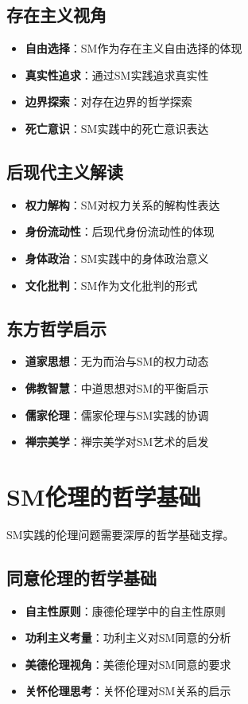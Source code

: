 \documentclass[12pt,UTF8]{ctexbook}
\begin{document}
\subsection{存在主义视角}
\begin{itemize}[leftmargin=2cm]
	\item \textbf{自由选择}：SM作为存在主义自由选择的体现
	\item \textbf{真实性追求}：通过SM实践追求真实性
	\item \textbf{边界探索}：对存在边界的哲学探索
	\item \textbf{死亡意识}：SM实践中的死亡意识表达
\end{itemize}

\subsection{后现代主义解读}
\begin{itemize}[leftmargin=2cm]
	\item \textbf{权力解构}：SM对权力关系的解构性表达
	\item \textbf{身份流动性}：后现代身份流动性的体现
	\item \textbf{身体政治}：SM实践中的身体政治意义
	\item \textbf{文化批判}：SM作为文化批判的形式
\end{itemize}

\subsection{东方哲学启示}
\begin{itemize}[leftmargin=2cm]
	\item \textbf{道家思想}：无为而治与SM的权力动态
	\item \textbf{佛教智慧}：中道思想对SM的平衡启示
	\item \textbf{儒家伦理}：儒家伦理与SM实践的协调
	\item \textbf{禅宗美学}：禅宗美学对SM艺术的启发
\end{itemize}

\section{SM伦理的哲学基础}
SM实践的伦理问题需要深厚的哲学基础支撑。

\subsection{同意伦理的哲学基础}
\begin{itemize}[leftmargin=2cm]
	\item \textbf{自主性原则}：康德伦理学中的自主性原则
	\item \textbf{功利主义考量}：功利主义对SM同意的分析
	\item \textbf{美德伦理视角}：美德伦理对SM同意的要求
	\item \textbf{关怀伦理思考}：关怀伦理对SM关系的启示
\end{itemize}
\end{document}
